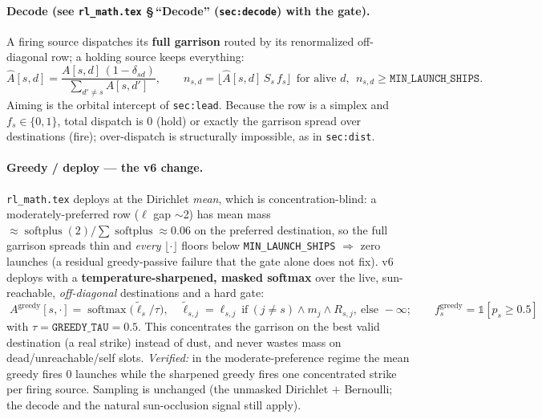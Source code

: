 \documentclass[11pt]{article}
\newcommand{\softplus}{\operatorname{softplus}}
\newcommand{\softmax}{\operatorname{softmax}}
\newcommand{\cd}[1]{\texttt{#1}}
\newcommand{\rlref}[2]{\textbf{see \texttt{rl\_math.tex} \S\,``#1''} (\texttt{#2})}
\begin{document}
\paragraph{Decode (\rlref{Decode}{sec:decode} with the gate).} A firing source dispatches its
\textbf{full garrison} routed by its renormalized off-diagonal row; a holding source keeps everything:
\begin{equation}
\hat A[s,d]=\frac{A[s,d]\,(1-\delta_{sd})}{\sum_{d'\neq s}A[s,d']},\qquad
n_{s,d}=\big\lfloor \hat A[s,d]\,S_s\,f_s\big\rfloor\ \ \text{for alive } d,\ \ n_{s,d}\ge\cd{MIN\_LAUNCH\_SHIPS}.
\end{equation}
Aiming is the orbital intercept of \texttt{sec:lead}. Because the row is a simplex and $f_s\in\{0,1\}$,
total dispatch is $0$ (hold) or exactly the garrison spread over destinations (fire); over-dispatch is
structurally impossible, as in \texttt{sec:dist}.

\paragraph{Greedy / deploy --- the v6 change.} \texttt{rl\_math.tex} deploys at the Dirichlet
\emph{mean}, which is concentration-blind: a moderately-preferred row ($\ell$ gap $\sim$2) has mean mass
$\approx\softplus(2)/\!\sum\softplus\approx0.06$ on the preferred destination, so the full garrison spreads
thin and \emph{every} $\lfloor\cdot\rfloor$ floors below \cd{MIN\_LAUNCH\_SHIPS} $\Rightarrow$ zero
launches (a residual greedy-passive failure that the gate alone does not fix). v6 deploys with a
\textbf{temperature-sharpened, masked softmax} over the live, sun-reachable, \emph{off-diagonal}
destinations and a hard gate:
\begin{equation}
\boxed{\;A^{\mathrm{greedy}}[s,\cdot]=\softmax\!\Big(\tilde\ell_s/\tau\Big),\quad
\tilde\ell_{s,j}=\ell_{s,j}\ \text{if}\ (j\neq s)\wedge m_j\wedge R_{s,j},\ \text{else } -\infty;\qquad
f_s^{\mathrm{greedy}}=\mathbb 1[p_s\ge 0.5]\;}
\end{equation}
with $\tau=\cd{GREEDY\_TAU}=0.5$. This concentrates the garrison on the best valid destination (a real
strike) instead of dust, and never wastes mass on dead/unreachable/self slots. \emph{Verified:} in the
moderate-preference regime the mean greedy fires $0$ launches while the sharpened greedy fires one
concentrated strike per firing source. Sampling is unchanged (the unmasked Dirichlet $+$ Bernoulli; the
decode and the natural sun-occlusion signal still apply).
\end{document}

